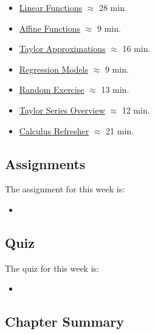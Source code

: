 \begin{itemize}
    \item \href{https://applied.cs.colorado.edu/mod/hvp/view.php?id=50678}{Linear Functions} $\approx$ 28 min.
    \item \href{https://applied.cs.colorado.edu/mod/hvp/view.php?id=50679}{Affine Functions} $\approx$ 9 min.
    \item \href{https://applied.cs.colorado.edu/mod/hvp/view.php?id=50680}{Taylor Approximations} $\approx$ 16 min.
    \item \href{https://applied.cs.colorado.edu/mod/hvp/view.php?id=50681}{Regression Models} $\approx$ 9 min.
    \item \href{https://applied.cs.colorado.edu/mod/hvp/view.php?id=50682}{Random Exercise} $\approx$ 13 min.
    \item \href{https://www.youtube.com/watch?v=eX1hvWxmJVE}{Taylor Series Overview} $\approx$ 12 min.
    \item \href{https://applied.cs.colorado.edu/mod/hvp/view.php?id=50684}{Calculus Refresher} $\approx$ 21 min.
\end{itemize}

\subsection{Assignments}

The assignment for this week is:

\begin{itemize}
    \item {}
\end{itemize}

\subsection{Quiz}

The quiz for this week is:

\begin{itemize}
    \item {}
\end{itemize}

\newpage

\subsection{Chapter Summary}

